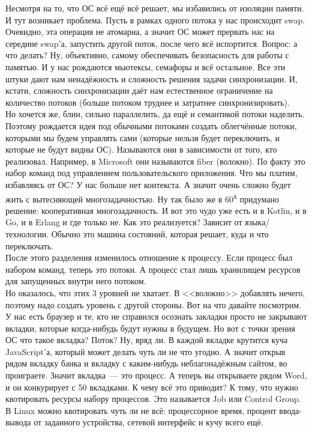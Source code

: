 \documentclass{article}
\begin{document}
    Несмотря на то, что ОС всё ещё всё решает, мы избавились от изоляции памяти. И тут возникает проблема. Пусть в рамках одного потока у нас происходит swap. Очевидно, эта операция не атомарна, а значит ОС может прервать нас на середине swap'а, запустить другой поток, после чего всё испортится. Вопрос: а что делать? Ну, объективно, самому обеспечивать безопасность для работы с памятью. И у нас рождаются мьютексы, семафоры и всё остальное. Все эти штуки дают нам ненадёжность и сложность решения задачи синхронизации. И, кстати, сложность синхронизации даёт нам естественное ограничение на количество потоков (больше потоком труднее и затратнее синхронизировать).\\
    Но хочется же, блин, сильно параллелить, да ещё и семантикой потоки наделить. Поэтому рождается идея под обычными потоками создать облегчённые потоки, которыми мы будем управлять сами (которые нельзя будет переключить, и которые не будут видны ОС). Называются они в зависимости от того, кто реализовал. Например, в Microsoft они называются fiber (волокно). По факту это набор команд под управлением пользовательского приложения. Что мы платим, избавляясь от ОС? У нас больше нет контекста. А значит очень сложно будет жить с вытесняющей многозадачностью. Ну так было же в 60\textsuperscript{х} придумано решение: кооперативная многозадачность. И вот это чудо уже есть и в Kotlin, и в Go, и в Erlang и где только не. Как это реализуется? Зависит от языка/технологии. Обычно это машина состояний, которая решает, куда и что переключать.\\
    После этого разделения изменилось отношение к процессу. Если процесс был набором команд, теперь это потоки. А процесс стал лишь хранилищем ресурсов для запущенных внутри него потоком.\\
    Но оказалось, что этих 3 уровней не хватает. В <<волокно>> добавлять нечего, поэтому надо создать уровень с другой стороны. Вот на что давайте посмотрим. У нас есть браузер и те, кто не справился осознать закладки просто не закрывают вкладки, которые когда-нибудь будут нужны в будущем. Но вот с точки зрения ОС что такое вкладка? Поток? Ну, вряд ли. В каждой вкладке крутится куча JavaScript'а, который может делать чуть ли не что угодно. А значит открыв рядом вкладку банка и вкладку с каким-нибудь неблагонадёжным сайтом, во проиграете. Значит вкладка~--- это процесс. А теперь вы открываете рядом Word, и он конкурирует с 50 вкладками. К чему всё это приводит? К тому, что нужно квотировать ресурсы набору процессов. Это называется Job или Control Group. В Linux можно квотировать чуть ли не всё: процессорное время, процент ввода-вывода от заданного устройства, сетевой интерфейс и кучу всего ещё.
\end{document}
